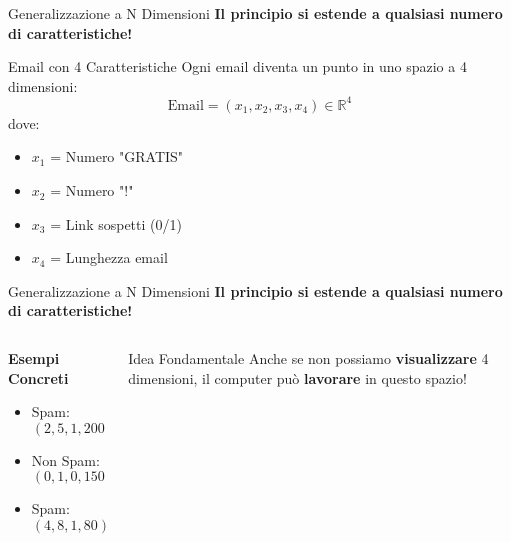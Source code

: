 \documentclass[aspectratio=169]{beamer}
\begin{document}
%
%
\begin{frame}{Generalizzazione a N Dimensioni}
\textbf{Il principio si estende a qualsiasi numero di caratteristiche!}

\vspace{0.5cm}

\begin{block}{Email con 4 Caratteristiche}
Ogni email diventa un punto in uno spazio a 4 dimensioni:
$$\text{Email} = (x_1, x_2, x_3, x_4) \in \mathbb{R}^4$$
dove:
\begin{itemize}
    \item $x_1$ = Numero "GRATIS"
    \item $x_2$ = Numero "!"  
    \item $x_3$ = Link sospetti (0/1)
    \item $x_4$ = Lunghezza email
\end{itemize}
\end{block}

\end{frame}
%
%
\begin{frame}{Generalizzazione a N Dimensioni}
\textbf{Il principio si estende a qualsiasi numero di caratteristiche!}

\vspace{0.5cm}

\begin{columns}
\begin{column}{0.45\textwidth}
\textbf{Esempi Concreti}
\begin{itemize}
    \item Spam: $(2, 5, 1, 200)$
    \item Non Spam: $(0, 1, 0, 150)$
    \item Spam: $(4, 8, 1, 80)$
\end{itemize}
\end{column}
\begin{column}{0.45\textwidth}
\begin{alertblock}{Idea Fondamentale}
Anche se non possiamo \textbf{visualizzare} 4 dimensioni, il computer può \textbf{lavorare} in questo spazio!
\end{alertblock}
\end{column}
\end{columns}
\end{frame}
%
%
\end{document}
